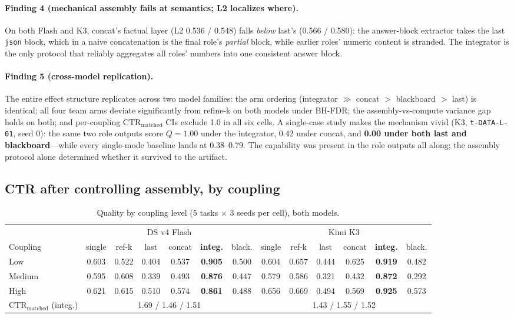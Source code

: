 \documentclass{article}
\newcommand{\ctrm}{\mathrm{CTR}_{\text{matched}}}
\newcommand{\code}[1]{\texttt{#1}}
\begin{document}
\paragraph{Finding 4 (mechanical assembly fails at semantics; L2 localizes where).} On both Flash and K3, concat's factual layer (L2 0.536 / 0.548) falls \emph{below} last's (0.566 / 0.580): the answer-block extractor takes the last \code{json} block, which in a naive concatenation is the final role's \emph{partial} block, while earlier roles' numeric content is stranded. The integrator is the only protocol that reliably aggregates all roles' numbers into one consistent answer block.

\paragraph{Finding 5 (cross-model replication).} The entire effect structure replicates across two model families: the arm ordering (integrator $\gg$ concat $>$ blackboard $>$ last) is identical; all four team arms deviate significantly from refine-k on both models under BH-FDR; the assembly-vs-compute variance gap holds on both; and per-coupling $\ctrm$ CIs exclude 1.0 in all six cells. A single-case study makes the mechanism vivid (K3, \code{t-DATA-L-01}, seed 0): the same two role outputs score $Q=1.00$ under the integrator, 0.42 under concat, and \textbf{0.00 under both last and blackboard}---while every single-mode baseline lands at 0.38--0.79. The capability was present in the role outputs all along; the assembly protocol alone determined whether it survived to the artifact.

\subsection{CTR after controlling assembly, by coupling}
\label{sec:coupling}

\begin{table}[t]
\centering
\caption{Quality by coupling level (5 tasks $\times$ 3 seeds per cell), both models.}
\label{tab:coupling}
\small
\setlength{\tabcolsep}{3.2pt}
\begin{tabular}{lcccccc|cccccc}
\toprule
& \multicolumn{6}{c|}{DS v4 Flash} & \multicolumn{6}{c}{Kimi K3} \\
Coupling & single & ref-k & last & concat & \textbf{integ.} & black. & single & ref-k & last & concat & \textbf{integ.} & black. \\
\midrule
Low & 0.603 & 0.522 & 0.404 & 0.537 & \textbf{0.905} & 0.500 & 0.604 & 0.657 & 0.444 & 0.625 & \textbf{0.919} & 0.482 \\
Medium & 0.595 & 0.608 & 0.339 & 0.493 & \textbf{0.876} & 0.447 & 0.579 & 0.586 & 0.321 & 0.432 & \textbf{0.872} & 0.292 \\
High & 0.621 & 0.615 & 0.510 & 0.574 & \textbf{0.861} & 0.488 & 0.656 & 0.669 & 0.494 & 0.569 & \textbf{0.925} & 0.573 \\
\midrule
$\ctrm$ (integ.) & \multicolumn{6}{c|}{1.69 / 1.46 / 1.51} & \multicolumn{6}{c}{1.43 / 1.55 / 1.52} \\
\bottomrule
\end{tabular}
\end{table}
\end{document}
